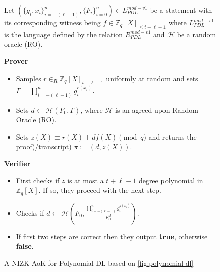 \begin{figure}[ht]
    \centering
    \begin{tcolorbox}[title=$\pi_{PDL}^{mod-v1}$, width=0.9\textwidth, colframe=blue!75!black, colback=blue!10, sharp corners]
        Let $(\{g_i,x_i\}_{i=-(\ell-1)}^n,\{F_i\}_{i=0}^n)\in L_{PDL}^{mod-v1}$ be a statement with its corresponding witness being $f\in\mathbb{Z}_q[X]_{\leq t+\ell-1}$ 
        where $L_{PDL}^{mod-v1}$ is the language defined by the relation $R_{PDL}^{mod-v1}$ and $\mathcal{H}$ be a 
        random oracle (RO).
        
        \vspace{0.5em}
        \textbf{Prover}
        \begin{itemize}
            \item Samples $r\in_{R}\mathbb{Z}_q[X]_{t+\ell-1}$ uniformly at random and sets 
              $\Gamma=\prod_{i=-(\ell-1)}^{n}g_i^{r(x_i)}$.
            \item Sets $d\leftarrow \mathcal{H}(F_0,\Gamma)$, where $\mathcal{H}$ is 
                an agreed upon Random Oracle (RO).
            \item Sets $z(X)\equiv r(X)+df(X) \pmod{q}$ and returns the proof(/transcript) $\pi:= (d,z(X))$.
        \end{itemize}
        
        \vspace{0.5em}
        \textbf{Verifier}
        \begin{itemize}
            \item First checks if $z$ is at most a $t+\ell-1$ degree polynomial in $\mathbb{Z}_q[X]$. If so, they proceed with the next step.
            \item Checks if $d\leftarrow \mathcal{H}(F_0,\frac{\prod_{i=-(\ell-1)}^{n}g_i^{z(x_i)}}{F_0^d})$. 
            \item If first two steps are correct then they output \textbf{true}, otherwise \textbf{false}.
        \end{itemize}
    \end{tcolorbox}
    \caption{A NIZK AoK for Polynomial DL based on \ref{fig:polynomial-dl}}
    \label{fig:mod-v1-polynomial-dl}
\end{figure}
